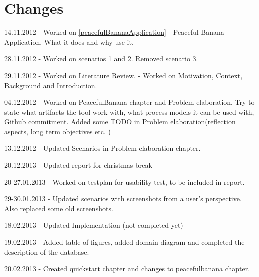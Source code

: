 \chapter*{Changes}
\begin{description}
\item 14.11.2012 - Worked on \autoref{peacefulBananaApplication} - Peaceful Banana Application. What it does and why use it.
\item 28.11.2012 - Worked on scenarios 1 and 2. Removed scenario 3. 
\item 29.11.2012 - Worked on Literature Review. - Worked on Motivation, Context, Background and Introduction. 
\item 04.12.2012 - Worked on PeacefulBanana chapter and Problem elaboration. Try to state what artifacts the tool work with, what process models it can be used with, Github commitment. Added some TODO in Problem elaboration(reflection aspects, long term objectives etc. )
\item 13.12.2012 - Updated Scenarios in Problem elaboration chapter. 
\item 20.12.2013 - Updated report for christmas break
\item 20-27.01.2013 - Worked on testplan for usability test, to be included in report. 
\item 29-30.01.2013 - Updated scenarios with screenshots from a user's perspective. Also replaced some old screenshots. 
\item 18.02.2013 - Updated Implementation (not completed yet)
\item 19.02.2013 - Added table of figures, added domain diagram and completed the description of the database.
\item 20.02.2013 - Created quickstart chapter and changes to peacefulbanana chapter.
\end{description}